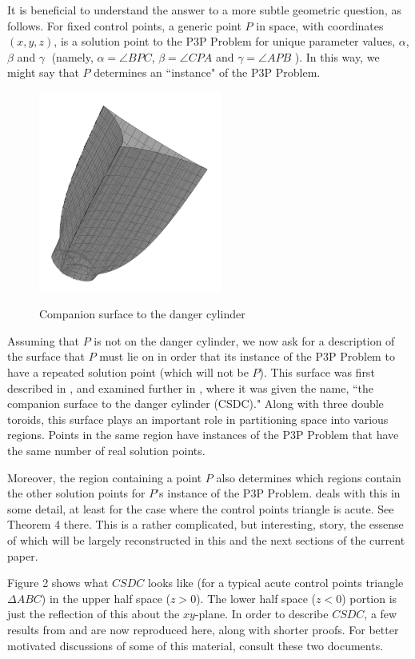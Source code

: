 \documentclass[a4paper, twoside]{article}
\begin{document}
It is beneficial to understand the answer to a more subtle geometric question, as follows. For fixed control points, a generic point $P$ in space, with coordinates $(x,y,z)$, is a solution point to the P3P Problem for unique parameter values, $\alpha$, $\beta$ and $\gamma \;$ (namely, $\alpha = \angle BPC$, $\beta = \angle CPA$ and $\gamma = \angle APB$ ). In this way, we might say that $P$ determines an ``instance" of the P3P Problem. 

\begin{figure} 
\centerline{ \includegraphics[width=6cm]{CSDC1.jpg} \ }
\caption{Companion surface to the danger cylinder} 
\end{figure} 

Assuming that $P$ is not on the danger cylinder, we now ask for a description of the surface that $P$ must lie on in order that its instance of the P3P Problem to have a repeated solution point (which will not be $P$). This surface was first described in \cite{R1}, and examined further in \cite{RW}, where it was given the name, ``the companion surface to the danger cylinder (CSDC)." Along with three double toroids, this surface plays an important role in partitioning space into various regions. Points in the same region have instances of the P3P Problem that have the same number of real solution points. 

Moreover, the region containing a point $P$ also determines which regions contain the other solution points for $P$'s instance of the P3P Problem. \cite{RW} deals with this in some detail, at least for the case where the control points triangle is acute. See Theorem 4 there. This is a rather complicated, but interesting, story, the essense of which will be largely reconstructed in this and the next sections of the current paper. 

Figure 2 shows what $CSDC$ looks like (for a typical acute control points triangle $\Delta ABC$) in the upper half space ($z > 0$). The lower half space ($z < 0$) portion is just the reflection of this about the $xy$-plane. In order to describe $CSDC$, a few results from \cite{RW} and \cite{R3} are now reproduced here, along with shorter proofs. For better motivated discussions of some of this material, consult these two documents. 
\end{document}
